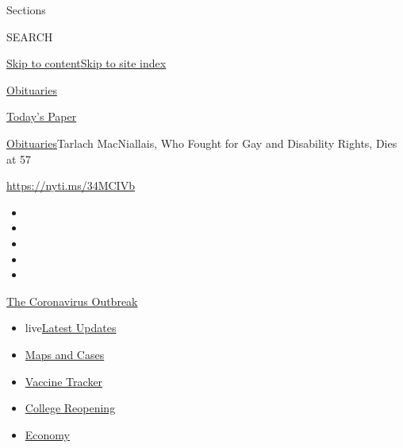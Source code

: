 Sections

SEARCH

\protect\hyperlink{site-content}{Skip to
content}\protect\hyperlink{site-index}{Skip to site index}

\href{https://www.nytimes3xbfgragh.onion/section/obituaries}{Obituaries}

\href{https://myaccount.nytimes3xbfgragh.onion/auth/login?response_type=cookie\&client_id=vi}{}

\href{https://www.nytimes3xbfgragh.onion/section/todayspaper}{Today's
Paper}

\href{/section/obituaries}{Obituaries}\textbar{}Tarlach MacNiallais, Who
Fought for Gay and Disability Rights, Dies at 57

\url{https://nyti.ms/34MCIVb}

\begin{itemize}
\item
\item
\item
\item
\item
\end{itemize}

\href{https://www.nytimes3xbfgragh.onion/news-event/coronavirus?action=click\&pgtype=Article\&state=default\&region=TOP_BANNER\&context=storylines_menu}{The
Coronavirus Outbreak}

\begin{itemize}
\tightlist
\item
  live\href{https://www.nytimes3xbfgragh.onion/2020/08/04/world/coronavirus-covid-19.html?action=click\&pgtype=Article\&state=default\&region=TOP_BANNER\&context=storylines_menu}{Latest
  Updates}
\item
  \href{https://www.nytimes3xbfgragh.onion/interactive/2020/us/coronavirus-us-cases.html?action=click\&pgtype=Article\&state=default\&region=TOP_BANNER\&context=storylines_menu}{Maps
  and Cases}
\item
  \href{https://www.nytimes3xbfgragh.onion/interactive/2020/science/coronavirus-vaccine-tracker.html?action=click\&pgtype=Article\&state=default\&region=TOP_BANNER\&context=storylines_menu}{Vaccine
  Tracker}
\item
  \href{https://www.nytimes3xbfgragh.onion/2020/08/02/us/covid-college-reopening.html?action=click\&pgtype=Article\&state=default\&region=TOP_BANNER\&context=storylines_menu}{College
  Reopening}
\item
  \href{https://www.nytimes3xbfgragh.onion/live/2020/08/03/business/stock-market-today-coronavirus?action=click\&pgtype=Article\&state=default\&region=TOP_BANNER\&context=storylines_menu}{Economy}
\end{itemize}

